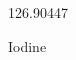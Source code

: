 \documentclass[12pt]{article}
\begin{document}
\hfill{}
\vfill
\begin{center}
  {\fontsize{50}{60}
  }

  \vspace{1em}

  126.90447

Iodine
\end{center}
\vfill
\end{document}
